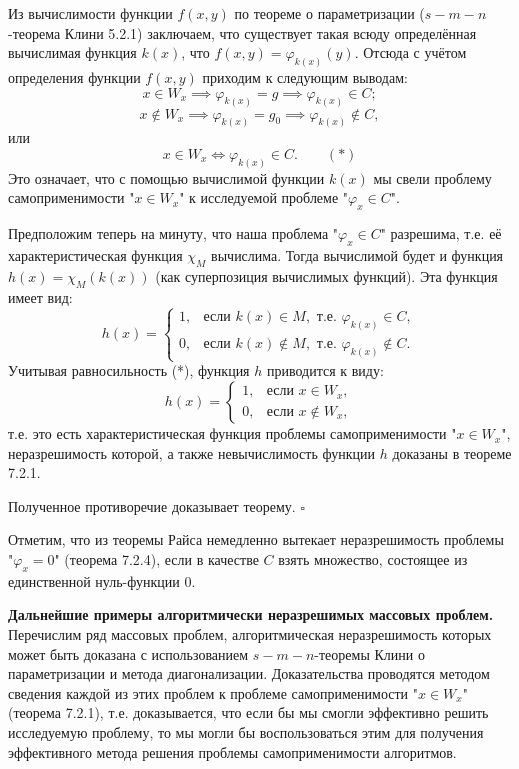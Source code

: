 \documentclass[a4paper,12pt]{article}
\begin{document}
Из вычислимости функции \(f(x, y)\) по теореме о параметризации (\(s-m-n\)-теорема Клини 5.2.1) заключаем, что существует такая всюду определённая вычислимая функция \(k(x)\), что \(f(x, y) = \varphi_{k(x)}(y)\). Отсюда с учётом определения функции \(f(x, y)\) приходим к следующим выводам:
\[
x \in W_x \implies \varphi_{k(x)} = g \implies \varphi_{k(x)} \in C;
\]
\[
x \notin W_x \implies \varphi_{k(x)} = g_0 \implies \varphi_{k(x)} \notin C,
\]
или
\[
x \in W_x \iff \varphi_{k(x)} \in C. \qquad (*)
\]
Это означает, что с помощью вычислимой функции \(k(x)\) мы свели проблему самоприменимости "\(x \in W_x\)" к исследуемой проблеме "\(\varphi_x \in C\)".

Предположим теперь на минуту, что наша проблема "\(\varphi_x \in C\)" разрешима, т.е. её характеристическая функция \(\chi_M\) вычислима. Тогда вычислимой будет и функция \(h(x) = \chi_M(k(x))\) (как суперпозиция вычислимых функций). Эта функция имеет вид:
\[
h(x) = 
\begin{cases}
1, & \text{если } k(x) \in M, \text{ т.е. } \varphi_{k(x)} \in C, \\
0, & \text{если } k(x) \notin M, \text{ т.е. } \varphi_{k(x)} \notin C.
\end{cases}
\]
Учитывая равносильность (*), функция \(h\) приводится к виду:
\[
h(x) = 
\begin{cases}
1, & \text{если } x \in W_x, \\
0, & \text{если } x \notin W_x,
\end{cases}
\]
т.е. это есть характеристическая функция проблемы самоприменимости "\(x \in W_x\)", неразрешимость которой, а также невычислимость функции \(h\) доказаны в теореме 7.2.1.

Полученное противоречие доказывает теорему. \(\square\)

Отметим, что из теоремы Райса немедленно вытекает неразрешимость проблемы "\(\varphi_x = 0\)" (теорема 7.2.4), если в качестве \(C\) взять множество, состоящее из единственной нуль-функции \(0\).

\textbf{Дальнейшие примеры алгоритмически неразрешимых массовых проблем.} Перечислим ряд массовых проблем, алгоритмическая неразрешимость которых может быть доказана с использованием \(s-m-n\)-теоремы Клини о параметризации и метода диагонализации. Доказательства проводятся методом сведения каждой из этих проблем к проблеме самоприменимости "\(x \in W_x\)" (теорема 7.2.1), т.е. доказывается, что если бы мы смогли эффективно решить исследуемую проблему, то мы могли бы воспользоваться этим для получения эффективного метода решения проблемы самоприменимости алгоритмов.
\end{document}
